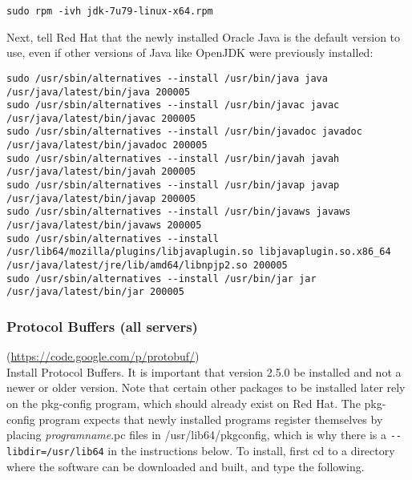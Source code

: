 \begin{verbatim}
sudo rpm -ivh jdk-7u79-linux-x64.rpm
\end{verbatim}

Next, tell Red Hat that the newly installed Oracle Java is the default
version to use, even if other versions of Java like OpenJDK were
previously installed:

\begin{verbatim}
sudo /usr/sbin/alternatives --install /usr/bin/java java /usr/java/latest/bin/java 200005 
sudo /usr/sbin/alternatives --install /usr/bin/javac javac /usr/java/latest/bin/javac 200005
sudo /usr/sbin/alternatives --install /usr/bin/javadoc javadoc /usr/java/latest/bin/javadoc 200005
sudo /usr/sbin/alternatives --install /usr/bin/javah javah /usr/java/latest/bin/javah 200005 
sudo /usr/sbin/alternatives --install /usr/bin/javap javap /usr/java/latest/bin/javap 200005 
sudo /usr/sbin/alternatives --install /usr/bin/javaws javaws /usr/java/latest/bin/javaws 200005 
sudo /usr/sbin/alternatives --install /usr/lib64/mozilla/plugins/libjavaplugin.so libjavaplugin.so.x86_64 /usr/java/latest/jre/lib/amd64/libnpjp2.so 200005
sudo /usr/sbin/alternatives --install /usr/bin/jar jar /usr/java/latest/bin/jar 200005
\end{verbatim}



\subsubsection{Protocol Buffers (all servers)} (\url{https://code.google.com/p/protobuf/})\\
Install Protocol Buffers.  It is important that version 2.5.0 be installed
and not a newer or older version.  Note that certain other packages
to be installed later rely on the pkg-config program, which should
already exist on Red Hat.  The pkg-config program expects that newly
installed programs register themselves by placing \emph{programname}.pc files in
/usr/lib64/pkgconfig, which is why there is a \verb|--libdir=/usr/lib64|
in the instructions below.  To install, first cd to a directory where
the software can be downloaded and built, and type the following.

